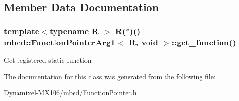 \subsection{Member Data Documentation}
\subsubsection[{\texorpdfstring{get\+\_\+function}{get_function}}]{\setlength{\rightskip}{0pt plus 5cm}template$<$typename R $>$ R($\ast$)() {\bf mbed\+::\+Function\+Pointer\+Arg1}$<$ R, void $>$\+::get\+\_\+function()\hspace{0.3cm}{\ttfamily [inline]}}\hypertarget{classmbed_1_1_function_pointer_arg1_3_01_r_00_01void_01_4_a792794bb5157153b294de75f0fc6fc92}{}\label{classmbed_1_1_function_pointer_arg1_3_01_r_00_01void_01_4_a792794bb5157153b294de75f0fc6fc92}
Get registered static function 

The documentation for this class was generated from the following file\+:\begin{DoxyCompactItemize}
\item 
Dynamixel-\/\+M\+X106/mbed/Function\+Pointer.\+h\end{DoxyCompactItemize}
